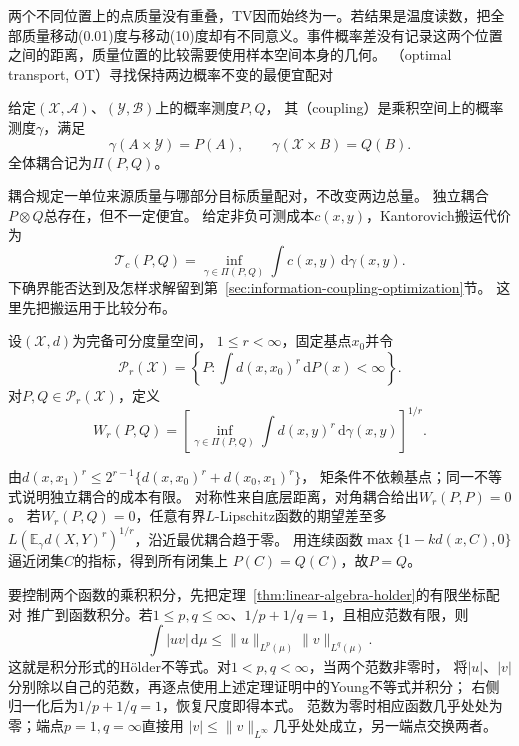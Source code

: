 两个不同位置上的点质量没有重叠，TV因而始终为一。若结果是温度读数，把全部质量移动(0.01)度与移动(10)度却有不同意义。事件概率差没有记录这两个位置之间的距离，质量位置的比较需要使用样本空间本身的几何。
（optimal transport, OT）寻找保持两边概率不变的最便宜配对

\begin{definition}[耦合]
\label{def:information-coupling}
给定\((\mathcal X,\mathcal A)\)、\((\mathcal Y,\mathcal B)\)上的概率测度\(P,Q\)，
其（coupling）是乘积空间上的概率测度\(\gamma\)，满足
\[
  \gamma(A\times\mathcal Y)=P(A),\qquad
  \gamma(\mathcal X\times B)=Q(B).
\]
全体耦合记为\(\Pi(P,Q)\)。
\end{definition}
耦合规定一单位来源质量与哪部分目标质量配对，不改变两边总量。
独立耦合\(P\otimes Q\)总存在，但不一定便宜。
给定非负可测成本\(c(x,y)\)，Kantorovich搬运代价为
\begin{equation}
  \mathcal T_c(P,Q)=\inf_{\gamma\in\Pi(P,Q)}
                      \int c(x,y)\,\mathrm d\gamma(x,y).
  \label{eq:information-kantorovich-transport}
\end{equation}
下确界能否达到及怎样求解留到第~\ref{sec:information-coupling-optimization}节。
这里先把搬运用于比较分布。

\begin{definition}[Wasserstein距离]
\label{def:information-wasserstein-distance}
设\((\mathcal X,d)\)为完备可分度量空间，
\(1\leq r<\infty\)，固定基点\(x_0\)并令
\[
  \mathcal P_r(\mathcal X)=
   \left\{P:\int d(x,x_0)^r\,\mathrm dP(x)<\infty\right\}.
\]
对\(P,Q\in\mathcal P_r(\mathcal X)\)，定义
\begin{equation}
  W_r(P,Q)=\left[
    \inf_{\gamma\in\Pi(P,Q)}\int d(x,y)^r\,\mathrm d\gamma(x,y)
  \right]^{1/r}.
  \label{eq:information-wasserstein-distance}
\end{equation}
\end{definition}

由\(d(x,x_1)^r\leq2^{r-1}\{d(x,x_0)^r+d(x_0,x_1)^r\}\)，
矩条件不依赖基点；同一不等式说明独立耦合的成本有限。
对称性来自底层距离，对角耦合给出\(W_r(P,P)=0\)。
若\(W_r(P,Q)=0\)，任意有界\(L\)-Lipschitz函数的期望差至多
\(L(\mathbb E_\gamma d(X,Y)^r)^{1/r}\)，沿近最优耦合趋于零。
用连续函数\(\max\{1-kd(x,C),0\}\)逼近闭集\(C\)的指标，得到所有闭集上
\(P(C)=Q(C)\)，故\(P=Q\)。

要控制两个函数的乘积积分，先把定理~\ref{thm:linear-algebra-holder}的有限坐标配对
推广到函数积分。若\(1\leq p,q\leq\infty\)、\(1/p+1/q=1\)，且相应范数有限，则
\begin{equation}
 \int|uv|\,\mathrm d\mu\leq
 \|u\|_{L^p(\mu)}\|v\|_{L^q(\mu)}.
 \label{eq:information-integral-holder}
\end{equation}
这就是积分形式的Hölder不等式。对\(1<p,q<\infty\)，当两个范数非零时，
将\(|u|\)、\(|v|\)分别除以自己的范数，再逐点使用上述定理证明中的Young不等式并积分；
右侧归一化后为\(1/p+1/q=1\)，恢复尺度即得本式。
范数为零时相应函数几乎处处为零；端点\(p=1,q=\infty\)直接用
\(|v|\leq\|v\|_{L^\infty}\)几乎处处成立，另一端点交换两者。

